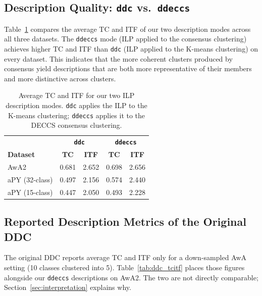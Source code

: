 \subsection{Description Quality: \texttt{ddc} vs.\ \texttt{ddeccs}}

Table~\ref{tab:tc_itf_comparison} compares the average TC and ITF of our two description modes across all three datasets. The \texttt{ddeccs} mode (ILP applied to the consensus clustering) achieves higher TC and ITF than \texttt{ddc} (ILP applied to the K-means clustering) on every dataset. This indicates that the more coherent clusters produced by consensus yield descriptions that are both more representative of their members and more distinctive across clusters.

\begin{table}[H]
    \centering
    \caption{Average TC and ITF for our two ILP description modes. \texttt{ddc} applies the ILP to the K-means clustering; \texttt{ddeccs} applies it to the DECCS consensus clustering.}
    \label{tab:tc_itf_comparison}
    \begin{tabular}{lcccc}
        \hline
        & \multicolumn{2}{c}{\textbf{\texttt{ddc}}} & \multicolumn{2}{c}{\textbf{\texttt{ddeccs}}} \\
        \textbf{Dataset} & \textbf{TC} & \textbf{ITF} & \textbf{TC} & \textbf{ITF} \\
        \hline
        AwA2 & 0.681 & 2.652 & 0.698 & 2.656 \\
        aPY (32-class) & 0.497 & 2.156 & 0.574 & 2.440 \\
        aPY (15-class) & 0.447 & 2.050 & 0.493 & 2.228 \\
        \hline
    \end{tabular}
\end{table}


\subsection{Reported Description Metrics of the Original DDC}
\label{subsec:ddc_tcitf_comparison}

The original DDC reports average TC and ITF only for a down-sampled AwA setting (10 classes clustered into 5). Table~\ref{tab:ddc_tcitf} places those figures alongside our \texttt{ddeccs} descriptions on AwA2. The two are not directly comparable; Section~\ref{sec:interpretation} explains why.

